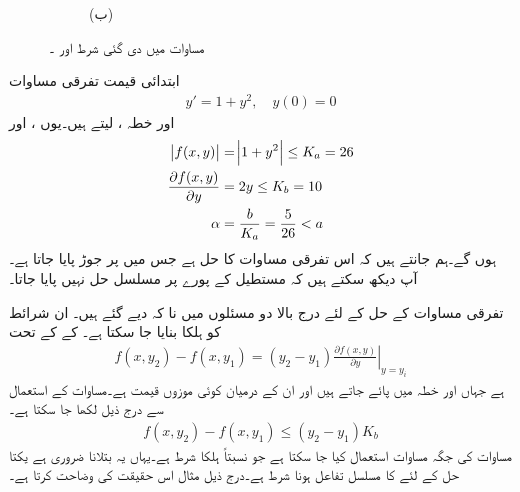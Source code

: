 \begin{figure}
\begin{subfigure}{0.5\textwidth}
\caption*{(ب)}
\end{subfigure}%
\caption{مساوات  میں دی گئی شرط اور ۔}
\label{شکل_سادہ_اول_مستطیل_ثبوت}
\end{figure}

ابتدائی قیمت تفرقی مساوات
\begin{align*}
y'=1+y^2,\quad y(0)=0
\end{align*}
اور خطہ ،  لیتے ہیں۔یوں ،   اور
\begin{align*}
\abs{f(x,y)}&=\abs{1+y^2}\le K_a=26\\
\frac{\partial f(x,y)}{\partial y}&=2y \le K_b=10\\
\alpha&=\frac{b}{K_a}=\frac{5}{26}< a
\end{align*}
ہوں گے۔ہم جانتے ہیں کہ اس تفرقی مساوات کا حل  ہے جس میں  پر جوڑ پایا جاتا ہے۔آپ دیکھ سکتے ہیں کہ مستطیل کے پورے  پر مسلسل حل نہیں پایا جاتا۔

تفرقی مساوات کے حل کے لئے درج بالا دو مسئلوں میں  نا کہ  دیے گئے ہیں۔ ان شرائط کو ہلکا بنایا جا سکتا ہے۔  کے  کے تحت
\begin{align*}
f(x,y_2)-f(x,y_1)=(y_2-y_1)\left. \frac{\partial f(x,y)}{\partial y}\right|_{y=y_{i}}
\end{align*}
ہے جہاں  اور  خطہ  میں پائے جاتے ہیں اور  ان کے درمیان کوئی  موزوں قیمت ہے۔مساوات  کے استعمال سے درج ذیل لکھا جا سکتا ہے۔
\begin{align}\label{مساوات_سادہ_اول_وجودیت_ث}
f(x,y_2)-f(x,y_1) \le (y_2-y_1) K_b
\end{align}
مساوات  کی جگہ  مساوات  استعمال کیا جا سکتا ہے جو نسبتاً ہلکا شرط ہے۔یہاں یہ بتلانا ضروری ہے یکتا حل کے لئے  کا مسلسل تفاعل ہونا   شرط  ہے۔درج ذیل مثال اس حقیقت کی وضاحت کرتا ہے۔

